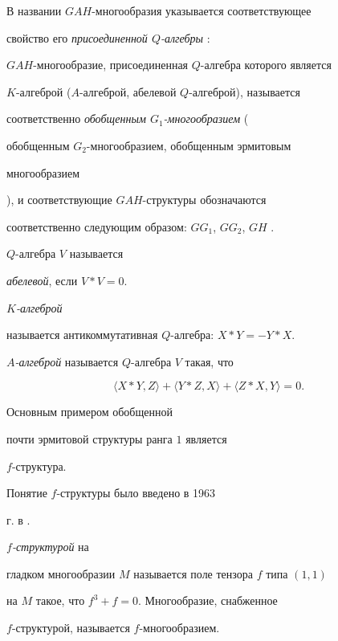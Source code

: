 В названии $GAH$-многообразия указывается соответствующее


свойство его {\it присоединенной $Q$-алгебры} \cite{Kir}:


$GAH$-многообразие, присоединенная $Q$-алгебра которого является


$K$-алгеброй ($A$-алгеброй, абелевой $Q$-алгеброй), называется


соответственно {\it обобщенным $G_1$-многообразием} ({\it


обобщенным $G_2$-многообразием, обобщенным эрмитовым


многообразием}), и соответствующие $GAH$-структуры обозначаются


соответственно следующим образом: $GG_1$, $GG_2$, $GH$ \cite{Kir}.





\begin{defn}


$Q$-алгебра $V$ называется


{\it абелевой}, если $V*V=0$.


{\it $K$-алгеброй}


называется антикоммутативная $Q$-алгебра: $X*Y{=}-Y*X$.


{\it $A$-алгеброй} называется $Q$-алгебра $V$ такая, что


\begin{equation}\label{1}


\langle X*Y,Z\rangle + \langle Y*Z,X \rangle + \langle Z*X,Y


\rangle =0.


\end{equation}


\end{defn}





Основным примером обобщенной


почти эрмитовой структуры ранга $1$ является


$f$-структура.


Понятие $f$-структуры было введено в 1963


г. в \cite{Yano}.





\begin{defn}


{\it $f$-структурой} на


гладком многообразии $M$ называется поле тензора $f$ типа $(1,1)$


на $M$ такое, что $f^3+f=0$. Многообразие, снабженное


$f$-структурой, называется $f$-многообразием.


\end{defn}





